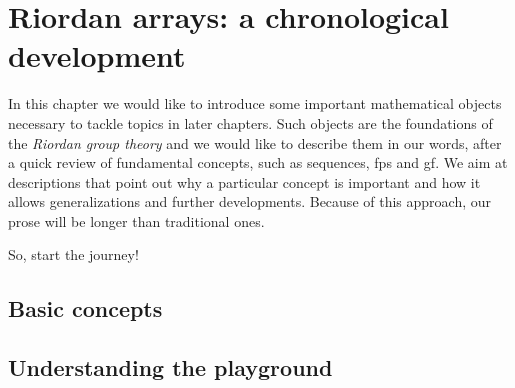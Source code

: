 
\chapter{Riordan arrays: a chronological development}
\label{ch:chronologial:development}

In this chapter we would like to introduce some important mathematical objects
necessary to tackle topics in later chapters. Such objects are the foundations
of the \emph{Riordan group theory} and we would like to describe them in our
words, after a quick review of fundamental concepts, such as sequences,
\ac{fps} and \ac{gf}.  We aim at descriptions that point out why a particular
concept is important and how it allows generalizations and further
developments. Because of this approach, our prose will be longer than
traditional ones.


So, start the journey!

\section{Basic concepts}



\section{Understanding the playground}








